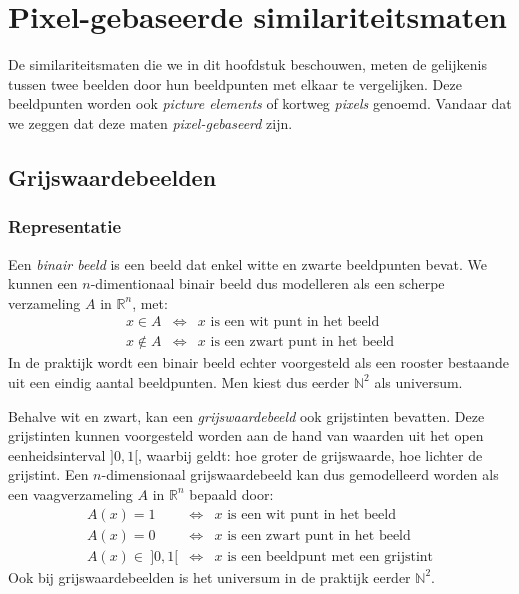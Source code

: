 \chapter{Pixel-gebaseerde similariteitsmaten}

De similariteitsmaten die we in dit hoofdstuk beschouwen,
meten de gelijkenis tussen twee beelden door hun beeldpunten met elkaar te vergelijken.
Deze beeldpunten worden ook \emph{picture elements} of kortweg \emph{pixels} genoemd. Vandaar
dat we zeggen dat deze maten \emph{pixel-gebaseerd} zijn.

\section{Grijswaardebeelden}

\subsection{Representatie}

Een \emph{binair beeld} is een beeld dat enkel witte en zwarte beeldpunten bevat. We kunnen een 
$n$-dimentionaal binair beeld dus modelleren als een scherpe verzameling $A$ in $\mathbb{R}^n$, met:
$$
\begin{array}{rcl}
x \in A & \iff & x \textrm{ is een wit punt in het beeld} \\
x \notin A & \iff & x \textrm{ is een zwart punt in het beeld}
\end{array}
$$ 
In de praktijk wordt een binair beeld echter voorgesteld als een rooster bestaande uit een
eindig aantal beeldpunten. Men kiest dus eerder $\mathbb{N}^2$ als universum.

Behalve wit en zwart, kan een \emph{grijswaardebeeld} ook grijstinten bevatten. Deze grijstinten
kunnen voorgesteld worden aan de hand van waarden uit het open eenheidsinterval $]0,1[$, waarbij
geldt: hoe groter de grijswaarde, hoe lichter de grijstint. Een $n$-dimensionaal grijswaardebeeld
kan dus gemodelleerd worden als een vaagverzameling $A$ in $\mathbb{R}^n$ bepaald door:
$$
\begin{array}{rcl}
A(x) = 1 & \iff & x \textrm{ is een wit punt in het beeld} \\
A(x) = 0 & \iff & x \textrm{ is een zwart punt in het beeld} \\
A(x) \in\ ]0,1[ & \iff & x \textrm{ is een beeldpunt met een grijstint}
\end{array}
$$
Ook bij grijswaardebeelden is het universum in de praktijk eerder $\mathbb{N}^2$.

